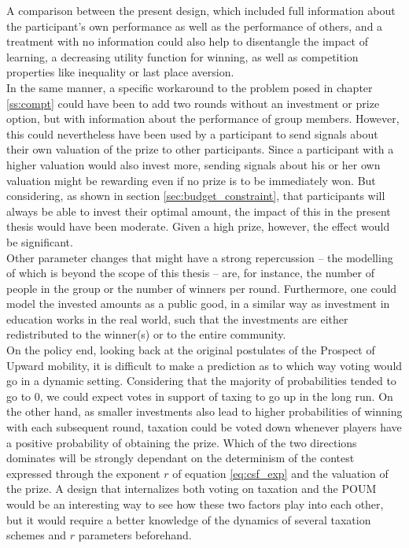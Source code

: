 A comparison between the present design, which included full information about the participant's own performance as well as the performance of others, and a treatment with no information could also help to disentangle the impact of learning, a decreasing utility function for winning, as well as competition properties like inequality or last place aversion.\\

In the same manner, a specific workaround to the problem posed in chapter \ref{ss:compt} could have been to add two rounds without an investment or prize option, but with information about the performance of group members. However, this could nevertheless have been used by a participant to send signals about their own valuation of the prize to other participants. Since a participant with a higher valuation would also invest more, sending signals about his or her own valuation might be rewarding even if no prize is to be immediately won. But considering, as shown in section \ref{sec:budget_constraint}, that participants will always be able to invest their optimal amount, the impact of this in the present thesis would have been moderate. Given a high prize, however, the effect would be significant.\\

Other parameter changes that might have a strong repercussion -- the modelling of which is beyond the scope of this thesis -- are, for instance, the number of people in the group or the number of winners per round. Furthermore, one could model the invested amounts as a public good, in a similar way as investment in education works in the real world, such that the investments are either redistributed to the winner(s) or to the entire community.\\

On the policy end, looking back at the original postulates of the Prospect of Upward mobility, it is difficult to make a prediction as to which way voting would go in a dynamic setting. Considering that the majority of probabilities tended to go to 0, we could expect votes in support of taxing to go up in the long run. On the other hand, as smaller investments also lead to higher probabilities of winning with each subsequent round, taxation could be voted down whenever players have a positive probability of obtaining the prize. Which of the two directions dominates will be strongly dependant on the determinism of the contest expressed through the exponent $r$ of equation \ref{eq:csf_exp} and the valuation of the prize. A design that internalizes both voting on taxation and the POUM would be an interesting way to see how these two factors play into each other, but it would require a better knowledge of the dynamics of several taxation schemes and $r$ parameters beforehand.\\

